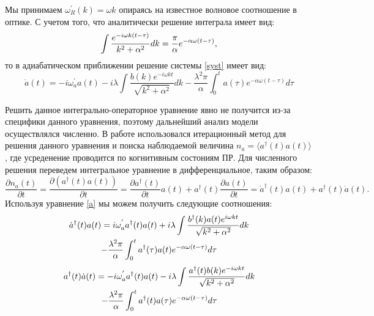 Мы принимаем $\omega^{'}_{R}(k) = \omega k$ опираясь на известное волновое соотношение в оптике.
С учетом того, что аналитически решение интеграла имеет вид:
\begin{equation}\notag
    \int \frac{e^{-i \omega k (t - \tau)}}{k^{2} + \alpha^{2}} dk = \frac{\pi}{\alpha} e^{-\alpha \omega (t - \tau)},
\end{equation}
то в адиабатическом приближении решение системы \eqref{syst} имеет вид:
\begin{equation}\label{a}
    \dot{a}(t) =
    -i \omega^{'}_{a} a(t)
    -i \lambda \int \frac{b(k)e^{-i \omega k t}}{\sqrt{k^{2} + \alpha^2}} dk
    -\frac{\lambda^{2} \pi}{\alpha} \int_{0}^{t} a(\tau) e^{- \alpha \omega (t - \tau)} d\tau
\end{equation}

Решить данное интегрально-операторное уравнение явно не получится из-за специфики данного уравнения,
поэтому дальнейший анализ модели осуществлялся численно.
В работе использовался итерационный метод для решения данного уравнения и поиска наблюдаемой
величина $n_a=\langle{a^{\dagger}(t)a(t)\rangle}$, где усреденение проводится по когнитивным состониям ПР.
Для численного решения переведем интегральное уравнение в дифференциальное, таким образом:
\begin{equation}\label{dot_na}
\frac{\partial n_{a}(t)}{\partial t}
= \frac{\partial (a^{\dagger}(t) a(t))}{\partial t}
= \frac{\partial a^{\dagger}(t)}{\partial t}a(t) + a^{\dagger}(t)\frac{\partial a(t)}{\partial t}
= \dot{a}^{\dagger}(t) a(t) + a^{\dagger}(t) \dot{a}(t).
\end{equation}
Используя уравнение \eqref{a} мы можем получить следующие соотношения:
\begin{multline}\notag
    \dot{a}^{\dagger}(t) a(t)=
    i \omega^{'}_{a} a^{\dagger}(t) a(t)
    + i \lambda \int \frac{b^{\dagger}(k) a(t) e^{i \omega k t}}{\sqrt{k^{2} + \alpha^2}} dk \\
    -\frac{\lambda^{2} \pi}{\alpha} \int_{0}^{t} a^{\dagger}(\tau) a(t) e^{- \alpha \omega (t - \tau)} d\tau
\end{multline}
\begin{multline}\notag
    a^{\dagger}(t) \dot{a}(t) =
    -i \omega^{'}_{a} a^{\dagger}(t) a(t)
    -i \lambda \int \frac{a^{\dagger}(t) b(k)e^{-i \omega k t}}{\sqrt{k^{2} + \alpha^2}} dk \\
    - \frac{\lambda^{2} \pi}{\alpha} \int_{0}^{t} a^{\dagger}(t) a(\tau) e^{- \alpha \omega (t - \tau)} d\tau
\end{multline}
